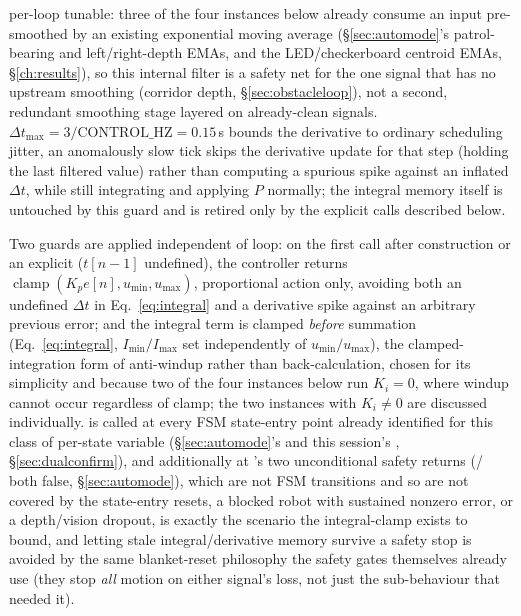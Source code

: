 per-loop tunable: three of the four instances below already consume an
input pre-smoothed by an existing exponential moving average
(\S\ref{sec:automode}'s patrol-bearing and left/right-depth EMAs, and the
LED/checkerboard centroid EMAs, \S\ref{ch:results}), so this internal
filter is a safety net for the one signal that has no upstream smoothing
(corridor depth, \S\ref{sec:obstacleloop}), not a second, redundant
smoothing stage layered on already-clean signals. $\Delta t_{\max} =
3/\text{CONTROL\_HZ} = 0.15$\,s bounds the derivative to ordinary
scheduling jitter, an anomalously slow tick skips the derivative update
for that step (holding the last filtered value) rather than computing a
spurious spike against an inflated $\Delta t$, while still integrating and
applying $P$ normally; the integral memory itself is untouched by this
guard and is retired only by the explicit  calls described
below.

Two guards are applied independent of loop: on the first call after
construction or an explicit  ($t[n-1]$ undefined), the
controller returns $\operatorname{clamp}(K_p e[n], u_{\min}, u_{\max})$,
proportional action only, avoiding both an undefined $\Delta t$ in
Eq.~\ref{eq:integral} and a derivative spike against an arbitrary previous
error; and the integral term is clamped \emph{before} summation
(Eq.~\ref{eq:integral}, $I_{\min}/I_{\max}$ set independently of
$u_{\min}/u_{\max}$), the clamped-integration form of anti-windup rather
than back-calculation, chosen for its simplicity and because two of the
four instances below run $K_i=0$, where windup cannot occur regardless of
clamp; the two instances with $K_i \neq 0$ are discussed individually.
 is called at every FSM state-entry point already
identified for this class of per-state variable (\S\ref{sec:automode}'s
 and this session's ,
\S\ref{sec:dualconfirm}), and additionally at 's two
unconditional safety returns (/ both
false, \S\ref{sec:automode}), which are not FSM transitions and so are not
covered by the state-entry resets, a blocked robot with sustained nonzero
error, or a depth/vision dropout, is exactly the scenario the
integral-clamp exists to bound, and letting stale integral/derivative
memory survive a safety stop is avoided by the same blanket-reset
philosophy the safety gates themselves already use (they stop \emph{all}
motion on either signal's loss, not just the sub-behaviour that needed
it).

